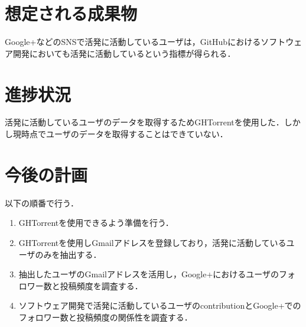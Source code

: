 \documentclass[uplatex,twocolumn,dvipdfmx]{jsarticle}
\begin{document}
\section{想定される成果物}

Google+などのSNSで活発に活動しているユーザは，GitHubにおけるソフトウェア開発においても活発に活動しているという指標が得られる．

\section{進捗状況}

活発に活動しているユーザのデータを取得するためGHTorrentを使用した．しかし現時点でユーザのデータを取得することはできていない．

\section{今後の計画}


以下の順番で行う．

\begin{enumerate}
 \item GHTorrentを使用できるよう準備を行う．
 \item GHTorrentを使用しGmailアドレスを登録しており，活発に活動しているユーザのみを抽出する．
 \item 抽出したユーザのGmailアドレスを活用し，Google+におけるユーザのフォロワー数と投稿頻度を調査する．
 \item ソフトウェア開発で活発に活動しているユーザのcontributionとGoogle+でのフォロワー数と投稿頻度の関係性を調査する．
\end{enumerate}





\end{document}
